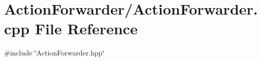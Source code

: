 \section{Action\+Forwarder/\+Action\+Forwarder.cpp File Reference}
\label{_action_forwarder_8cpp}
{\ttfamily \#include \char`\"{}Action\+Forwarder.\+hpp\char`\"{}}\newline
